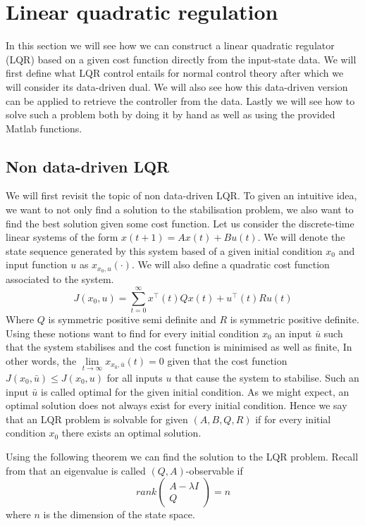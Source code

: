 \section{Linear quadratic regulation}
In this section we will see how we can construct a linear quadratic regulator (LQR) based on a given cost function directly from the input-state data. We will first define what LQR control entails for normal control theory after which we will consider its data-driven dual. We will also see how this data-driven version can be applied to retrieve the controller from the data. Lastly we will see how to solve such a problem both by doing it by hand as well as using the provided Matlab functions.

\subsection{Non data-driven LQR}
We will first revisit the topic of non data-driven LQR. To given an intuitive idea, we want to not only find a solution to the stabilisation problem, we also want to find the best solution given some cost function. Let us consider the discrete-time linear systems of the form $x(t+1) = Ax(t) + Bu(t)$. We will denote the state sequence generated by this system based of a given initial condition $x_0$ and input function $u$ as $x_{x_0 , u}(\cdot)$. We will also define a quadratic cost function associated to the system.
\begin{equation*}
J(x_0 , u) = \sum_{t=0}^{\infty} x^\top (t) Q x (t) + u^\top (t) R u (t)
\end{equation*}
Where $Q$ is symmetric positive semi definite and $R$ is symmetric positive definite. Using these notions want to find for every initial condition $x_0$ an input $\bar{u}$ such that the system stabilises and the cost function is minimised as well as finite, In other words, the $\lim\limits_{t \to \infty} x_{x_0 , \bar{u}}(t) = 0$ given that the cost function $J(x_0 , \bar{u}) \leq J(x_0 , u)$ for all inputs $u$ that cause the system to stabilise. Such an input $\bar{u}$ is called optimal for the given initial condition. As we might expect, an optimal solution does not always exist for every initial condition. Hence we say that an LQR problem is solvable for given $(A,B,Q,R)$ if for every initial condition $x_0$ there exists an optimal solution.

Using the following theorem we can find the solution to the LQR problem. Recall from \cite[Def 3.12]{bookTrentelman} that an eigenvalue is called $(Q,A)$-observable if 
$$rank\begin{pmatrix}A - \lambda I \\ Q \end{pmatrix} = n$$
where $n$ is the dimension of the state space.

